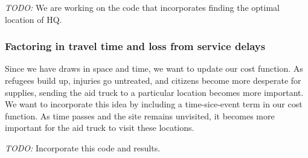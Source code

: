 \documentclass{article} %
\begin{document}
\emph{TODO:} We are working on the code that incorporates finding the optimal location of HQ.

\subsubsection*{Factoring in travel time and loss from service delays}

Since we have draws in space and time, we want to update our cost function. As refugees build up, injuries go untreated, and citizens become more desperate for supplies, sending the aid truck to a particular location becomes more important. We want to incorporate this idea by including a time-sice-event term in our cost function. As time passes and the site remains unvisited, it becomes more important for the aid truck to visit these locations. 

\emph{TODO:} Incorporate this code and results.


\end{document}
